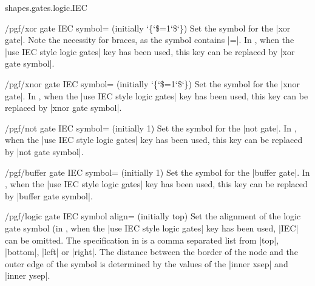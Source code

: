 \begin{pgflibrary}{shapes.gates.logic.IEC}
\begin{key}{/pgf/xor gate IEC symbol= (initially \char`\{\char`\$=1\char`\$\char`\})}
  Set the symbol for the |xor gate|. Note the necessity for braces,
  as the symbol contains |=|.
  In \tikzname, when the |use IEC style logic gates| key has been
  used, this key can be replaced by |xor gate symbol|.
\end{key}

\begin{key}{/pgf/xnor gate IEC symbol= (initially  \char`\{\char`\$=1\char`\$\char`\})}
  Set the symbol for the |xnor gate|.
  In \tikzname, when the |use IEC style logic gates| key has been
  used, this key can be replaced by |xnor gate symbol|.
\end{key}

\begin{key}{/pgf/not gate IEC symbol= (initially 1)}
  Set the symbol for the |not gate|.
  In \tikzname, when the |use IEC style logic gates| key has been
  used, this key can be replaced by |not gate symbol|.
\end{key}

\begin{key}{/pgf/buffer gate IEC symbol= (initially 1)}
  Set the symbol for the |buffer gate|.
  In \tikzname, when the |use IEC style logic gates| key has been
  used, this key can be replaced by |buffer gate symbol|.
\end{key}

\begin{key}{/pgf/logic gate IEC symbol align= (initially top)}
  Set the alignment of the logic gate symbol (in \tikzname, when the
  |use IEC style logic gates| key has been used, |IEC| can be omitted.
  The specification in  is a comma separated list from
  |top|, |bottom|, |left| or |right|. The distance between the border
  of the node and the outer edge of the symbol is determined by the values
  of the |inner xsep| and |inner ysep|.

\begin{codeexample}[]
\end{codeexample}


\end{key}
\end{pgflibrary}
